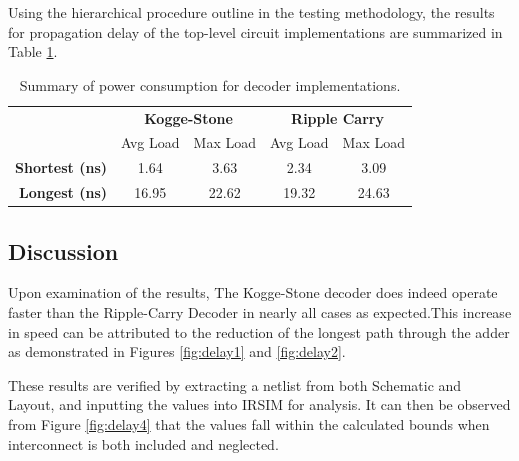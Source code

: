 \documentclass[conference]{IEEEtran}
\begin{document}
Using the hierarchical procedure outline in the testing methodology, the results for propagation delay of the top-level circuit implementations are summarized in Table \ref{tab:delay3}.

\FloatBarrier
\begin{table}[H]
\centering
\caption{Summary of power consumption for decoder implementations.}
\label{tab:delay3}
\begin{tabular}{|r|cc|cc|}
\hline
\multicolumn{1}{|l|}{\cellcolor[HTML]{9B9B9B}{\color[HTML]{9B9B9B} }} & \multicolumn{2}{c|}{\textbf{Kogge-Stone}} & \multicolumn{2}{c|}{\textbf{Ripple Carry}} \\ \cline{2-5} 
\cellcolor[HTML]{9B9B9B}\textbf{}                                     & \multicolumn{1}{c|}{Avg Load}  & Max Load & \multicolumn{1}{c|}{Avg Load}  & Max Load  \\ \hline
\textbf{Shortest (ns)}                                                & 1.64                           & 3.63     & 2.34                           & 3.09      \\ \cline{1-1}
\textbf{Longest (ns)}                                                 & 16.95                          & 22.62    & 19.32                          & 24.63     \\ \hline
\end{tabular}
\end{table}
\FloatBarrier

\subsection{Discussion}

Upon examination of the results, The Kogge-Stone decoder does indeed operate faster than the Ripple-Carry Decoder in nearly all cases as expected.This increase in speed can be attributed to the reduction of the longest path through the adder as demonstrated in Figures \ref{fig:delay1} and \ref{fig:delay2}.

These results are verified by extracting a netlist from both Schematic and Layout, and inputting the values into IRSIM for analysis. It can then be observed from Figure \ref{fig:delay4} that the values fall within the calculated bounds when interconnect is both included and neglected.
\end{document}
